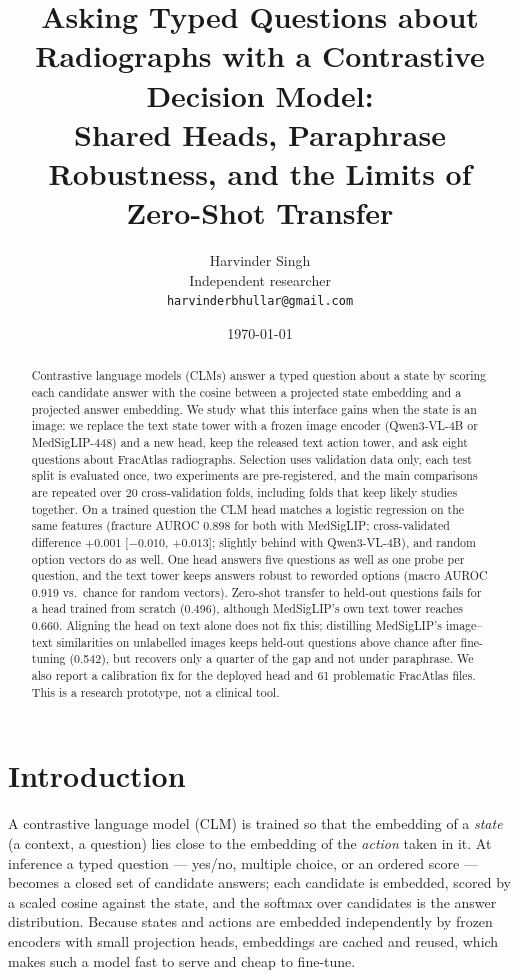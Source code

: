 \documentclass[11pt]{article}
\title{Asking Typed Questions about Radiographs with a Contrastive Decision Model:\\
Shared Heads, Paraphrase Robustness, and the Limits of Zero-Shot Transfer}
\author{Harvinder Singh\\
Independent researcher\\
\texttt{harvinderbhullar@gmail.com}}
\date{\today}
\begin{document}
\maketitle

\begin{abstract}
Contrastive language models (CLMs) answer a typed question about a state by scoring each candidate answer with the
cosine between a projected state embedding and a projected answer embedding. We study what this interface gains
when the state is an image: we replace the text state tower with a frozen image encoder (Qwen3-VL-4B or
MedSigLIP-448) and a new head, keep the released text action tower, and ask eight questions about FracAtlas
radiographs. Selection uses validation data only, each test split is evaluated once, two experiments are
pre-registered, and the main comparisons are repeated over 20 cross-validation folds, including folds that keep
likely studies together. On a trained question the CLM head matches a logistic regression on the same features
(fracture AUROC 0.898 for both with MedSigLIP; cross-validated difference $+0.001$ [$-0.010$, $+0.013$]; slightly
behind with Qwen3-VL-4B), and random option vectors do as well. One head answers five questions as well as one probe per question, and the text tower keeps answers
robust to reworded options (macro AUROC 0.919 vs.\ chance for random vectors). Zero-shot transfer to held-out
questions fails for a head trained from scratch (0.496), although MedSigLIP's own text tower reaches 0.660.
Aligning the head on text alone does not fix this; distilling MedSigLIP's image--text similarities on unlabelled
images keeps held-out questions above chance after fine-tuning (0.542), but recovers only a quarter of the gap and
not under paraphrase. We also report a calibration fix for the deployed head and 61 problematic FracAtlas files.
This is a research prototype, not a clinical tool.
\end{abstract}

\section{Introduction}

A contrastive language model (CLM) \citep{kwok2026clm} is trained so that the embedding of a \emph{state} (a
context, a question) lies close to the embedding of the \emph{action} taken in it. At inference a typed question
--- yes/no, multiple choice, or an ordered score --- becomes a closed set of candidate answers; each candidate is
embedded, scored by a scaled cosine against the state, and the softmax over candidates is the answer distribution.
Because states and actions are embedded independently by frozen encoders with small projection heads, embeddings
are cached and reused, which makes such a model fast to serve and cheap to fine-tune.
\end{document}
